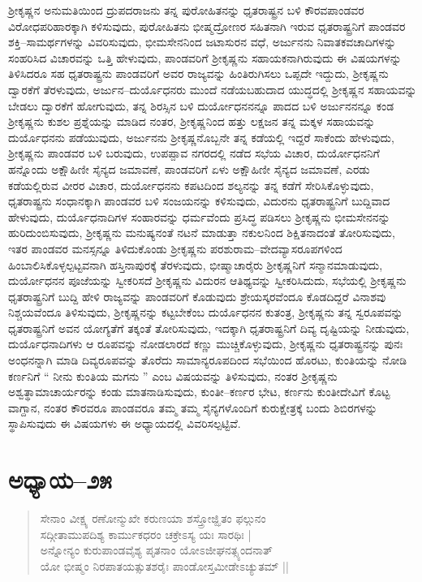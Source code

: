 ಶ‍್ರೀಕೃಷ್ಣನ ಅನುಮತಿಯಿಂದ ದ್ರುಪದರಾಜನು ತನ್ನ ಪುರೋಹಿತನನ್ನು ಧೃತರಾಷ್ಟ್ರನ ಬಳಿ ಕೌರವಪಾಂಡವರ ವಿರೋಧಪರಿಹಾರಕ್ಕಾಗಿ ಕಳಿಸುವುದು, ಪುರೋಹಿತನು ಭೀಷ್ಮದ್ರೋಣರ ಸಹಿತನಾಗಿ ಇರುವ ಧೃತರಾಷ್ಟ್ರನಿಗೆ ಪಾಂಡವರ ಶಕ್ತಿ–ಸಾಮರ್ಥಗಳನ್ನು ವಿವರಿಸುವುದು, ಭೀಮಸೇನನಿಂದ ಜಟಾಸುರನ ವಧೆ, ಅರ್ಜುನನು ನಿವಾತಕವಚಾದಿಗಳನ್ನು ಸಂಹರಿಸಿದ ವಿಚಾರವನ್ನು ಒತ್ತಿ ಹೇಳುವುದು, ಪಾಂಡವರಿಗೆ ಶ‍್ರೀಕೃಷ್ಣನು ಸಹಾಯಕನಾಗಿರುವುದು ಈ ವಿಷಯಗಳನ್ನು ತಿಳಿಸಿದರೂ ಸಹ ಧೃತರಾಷ್ಟ್ರನು ಪಾಂಡವರಿಗೆ ಅವರ ರಾಜ್ಯವನ್ನು ಹಿಂತಿರುಗಿಸಲು ಒಪ್ಪದೇ ಇದ್ದುದು, ಶ‍್ರೀಕೃಷ್ಣನು ದ್ವಾರಕೆಗೆ ತೆರಳುವುದು, ಅರ್ಜುನ–ದುರ್ಯೊಧನರು ಮುಂದೆ ನಡೆಯಬಹುದಾದ ಯುದ್ಧದಲ್ಲಿ ಶ‍್ರೀಕೃಷ್ಣನ ಸಹಾಯವನ್ನು ಬೇಡಲು ದ್ವಾರಕೆಗೆ ಹೋಗುವುದು, ತನ್ನ ಶಿರಸ್ಸಿನ ಬಳಿ ದುರ್ಯೋಧನನನ್ನೂ ಪಾದದ ಬಳಿ ಅರ್ಜುನನನ್ನೂ ಕಂಡ ಶ‍್ರೀಕೃಷ್ಣನು ಕುಶಲ ಪ್ರಶ್ನೆಯನ್ನು ಮಾಡಿದ ನಂತರ, ಶ‍್ರೀಕೃಷ್ಣನಿಂದ ಹತ್ತು ಲಕ್ಷಜನ ತನ್ನ ಮಕ್ಕಳ ಸಹಾಯವನ್ನು ದುರ್ಯೊಧನನು ಪಡೆಯುವುದು, ಅರ್ಜುನನು ಶ‍್ರೀಕೃಷ್ಣನೊಬ್ಬನೇ ತನ್ನ ಕಡೆಯಲ್ಲಿ ಇದ್ದರೆ ಸಾಕೆಂದು ಹೇಳುವುದು, ಶ‍್ರೀಕೃಷ್ಣನು ಪಾಂಡವರ ಬಳಿ ಬರುವುದು, ಉಪಪ್ಪಾವ ನಗರದಲ್ಲಿ ನಡೆದ ಸಭೆಯ ವಿಚಾರ, ದುರ್ಯೋಧನನಿಗೆ ಹನ್ನೊಂದು ಅಕ್ಷೌಹಿಣೀ ಸೈನ್ಯದ ಜಮಾವಣೆ, ಪಾಂಡವರಿಗೆ ಏಳು ಅಕ್ಷೌಹಿಣೀ ಸೈನ್ಯದ ಜಮಾವಣೆ, ಎರಡು ಕಡೆಯಲ್ಲಿರುವ ವೀರರ ವಿಚಾರ, ದುರ್ಯೋಧನನು ಕಪಟದಿಂದ ಶಲ್ಯನನ್ನು ತನ್ನ ಕಡೆಗೆ ಸೇರಿಸಿಕೊಳ್ಳುವುದು, ಧೃತರಾಷ್ಟ್ರನು ಸಂಧಾನಕ್ಕಾಗಿ ಪಾಂಡವರ ಬಳಿ ಸಂಜಯನನ್ನು ಕಳಿಸುವುದು, ವಿದುರನು ಧೃತರಾಷ್ಟ್ರನಿಗೆ ಬುದ್ದಿವಾದ ಹೇಳುವುದು, ದುರ್ಯೊಧನಾದಿಗಳ ಸಂಹಾರವನ್ನು ಧರ್ಮವೆಂದು ಪ್ರಸಿದ್ಧ ಪಡಿಸಲು ಶ‍್ರೀಕೃಷ್ಣನು ಭೀಮಸೇನನನ್ನು ಹುರಿದುಂಬಿಸುವುದು, ಶ‍್ರೀಕೃಷ್ಣನು ಮನುಷ್ಯನಂತೆ ನಟನೆ ಮಾಡುತ್ತಾ ನಕುಲನಿಂದ ಶಿಕ್ಷಿತನಾದಂತೆ ತೋರಿಸುವುದು, ಇತರ ಪಾಂಡವರ ಮನಸ್ಸನ್ನೂ ತಿಳಿದುಕೊಂಡು ಶ‍್ರೀಕೃಷ್ಣನು ಪರಶುರಾಮ–ವೇದವ್ಯಾಸರೂಪಗಳಿಂದ ಹಿಂಬಾಲಿಸಿಕೊಳ್ಳಲ್ಪಟ್ಟವನಾಗಿ ಹಸ್ತಿನಾಪುರಕ್ಕೆ ತೆರಳುವುದು, ಭೀಷ್ಮಾಚಾರೈರು ಶ‍್ರೀಕೃಷ್ಣನಿಗೆ ಸನ್ಮಾನಮಾಡುವುದು, ದುರ್ಯೋಧನನ ಪೂಜೆಯನ್ನು ಸ್ವೀಕರಿಸದೆ ಶ‍್ರೀಕೃಷ್ಣನು ವಿದುರನ ಆತಿಥ್ಯವನ್ನು ಸ್ವೀಕರಿಸಿದುದು, ಸಭೆಯಲ್ಲಿ ಶ‍್ರೀಕೃಷ್ಣನು ಧೃತರಾಷ್ಟ್ರನಿಗೆ ಬುದ್ದಿ ಹೇಳಿ ರಾಜ್ಯವನ್ನು ಪಾಂಡವರಿಗೆ ಕೊಡುವುದು ಶ್ರೇಯಸ್ಕರವೆಂದೂ ಕೊಡದಿದ್ದರೆ ವಿನಾಶವು ನಿಶ್ಚಯವೆಂದೂ ತಿಳಿಸುವುದು, ಶ‍್ರೀಕೃಷ್ಣನನ್ನು ಕಟ್ಟಬೇಕೆಂಬ ದುರ್ಯೊಧನನ ಕುತಂತ್ರ, ಶ‍್ರೀಕೃಷ್ಣನು ತನ್ನ ಸ್ವರೂಪವನ್ನು ಧೃತರಾಷ್ಟ್ರನಿಗೆ ಅವನ ಯೋಗ್ಯತೆಗೆ ತಕ್ಕಂತೆ ತೋರಿಸುವುದು, ಇದಕ್ಕಾಗಿ ಧೃತರಾಷ್ಟ್ರನಿಗೆ ದಿವ್ಯ ದೃಷ್ಟಿಯನ್ನು ನೀಡುವುದು, ದುರ್ಯೊಧನಾದಿಗಳು ಆ ರೂಪವನ್ನು ನೋಡಲಾರದೆ ಕಣ್ಣು ಮುಚ್ಚಿಕೊಳ್ಳುವುದು, ಶ‍್ರೀಕೃಷ್ಣನು ಧೃತರಾಷ್ಟ್ರನನ್ನು ಪುನಃ ಅಂಧನನ್ನಾಗಿ ಮಾಡಿ ದಿವ್ಯರೂಪವನ್ನು ತೊರೆದು ಸಾಮಾನ್ಯರೂಪದಿಂದ ಸಭೆಯಿಂದ ಹೊರಟು, ಕುಂತಿಯನ್ನು ನೋಡಿ ಕರ್ಣನಿಗೆ “ ನೀನು ಕುಂತಿಯ ಮಗನು ” ಎಂಬ ವಿಷಯವನ್ನು ತಿಳಿಸುವುದು, ನಂತರ ಶ‍್ರೀಕೃಷ್ಣನು ಅಶ್ವತ್ಥಾಮಾಚಾರ್ಯರನ್ನು ಕಂಡು ಮಾತನಾಡಿಸುವುದು, ಕುಂತೀ–ಕರ್ಣರ ಭೇಟ, ಕರ್ಣನು ಕುಂತೀದೇವಿಗೆ ಕೊಟ್ಟ ವಾಗ್ದಾನ, ನಂತರ ಕೌರವರೂ ಪಾಂಡವರೂ ತಮ್ಮ ತಮ್ಮ ಸೈನ್ಯಗಳೊಂದಿಗೆ ಕುರುಕ್ಷೇತ್ರಕ್ಕೆ ಬಂದು ಶಿಬಿರಗಳನ್ನು ಸ್ಥಾಪಿಸುವುದು ಈ ವಿಷಯಗಳು ಈ ಅಧ್ಯಾಯದಲ್ಲಿ ವಿವರಿಸಲ್ಪಟ್ಟಿವೆ.


\section{ಅಧ್ಯಾಯ–೨೫}

\begin{verse}
ಸೇನಾಂ ವೀಕ್ಷ್ಯ ರಣೋನ್ಮುಖೇ ಕರುಣಯಾ ಶಸ್ತ್ರೋಜ್ಝಿತಂ ಫಲ್ಗುನಂ\\ ಸದ್ಗೀತಾಮುಪದಿಶ್ಯ ಕಾರ್ಮುಕಧರಂ ಚಕ್ರೇಽಸ್ಯ ಯಃ ಸಾರಥಿಃ |\\ ಅನ್ನೋನ್ಯಂ ಕುರುಪಾಂಡವೈಶ್ಯ ಪೃತನಾಂ ಯೋಽಜೀಘನತ್ಸ್ಯಂದನಾತ್ \\ ಯೋ ಭೀಷ್ಮಂ ನಿರಪಾತಯತ್ಸುತಶರೈಃ ಪಾಂಡೋಸ್ತಮೀಡೇಽಚ್ಯುತಮ್ ||
\end{verse}

